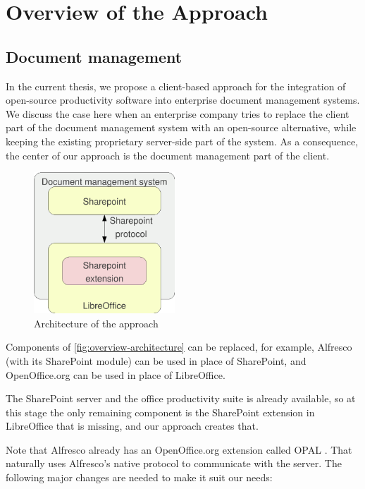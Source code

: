 \chapter{Overview of the Approach}

\section{Document management}

In the current thesis, we propose a client-based approach for the integration
of open-source productivity software into enterprise document management systems.
We discuss the case here when an enterprise company tries to replace the client
part of the document management system with an open-source alternative, while
keeping the existing proprietary server-side part of the system. As a
consequence, the center of our approach is the document management
part of the client.

\begin{figure}[H]
\centering
\includegraphics[width=200px,keepaspectratio]{overview-architecture.pdf}
\caption{Architecture of the approach}
\label{fig:overview-architecture}
\end{figure}

Components of \autoref{fig:overview-architecture} can be replaced, for example, Alfresco (with
its SharePoint module) can be used in place of SharePoint, and OpenOffice.org
can be used in place of LibreOffice.

The SharePoint server and the office productivity suite is already available, so
at this stage the only remaining component is the SharePoint extension in
LibreOffice that is missing, and our approach creates that.

Note that Alfresco already has an OpenOffice.org extension called
OPAL \cite{opal}. That naturally uses Alfresco's native protocol to communicate
with the server. The following major changes are needed to make it suit our
needs:

